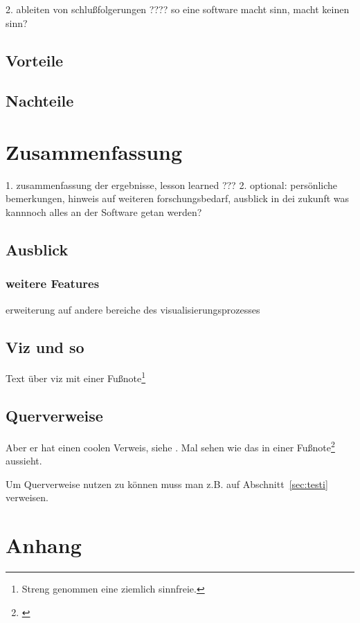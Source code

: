 \documentclass[a4paper, 12pt, onepage, pdftex, headsepline, footsepline]{scrreprt}
\begin{document}
2. ableiten von schlußfolgerungen
????
so eine software macht sinn, macht keinen sinn?
\section{Vorteile}
\section{Nachteile}

\chapter{Zusammenfassung}
1. zusammenfassung der ergebnisse, lesson learned
???
2. optional: persönliche bemerkungen, hinweis auf weiteren forschungsbedarf, ausblick in dei zukunft
was kannnoch alles an der Software getan werden?
\section{Ausblick}
\subsection{weitere Features}
erweiterung auf andere bereiche des visualisierungsprozesses


\section*{Viz und so}

Text über viz mit einer Fußnote\footnote{Streng genommen eine ziemlich sinnfreie.}

\section*{Querverweise}

Aber er hat einen coolen Verweis, siehe \cite[S.\,35--38]{Visualisierung}.
Mal sehen wie das in einer Fußnote\footnote{\cite{Visualisierung}} aussieht.

Um Querverweise nutzen zu können muss man z.B. auf Abschnitt~\ref{sec:testi} verweisen.



\listoftables
\listoffigures
\chapter{Anhang}
\end{document}
